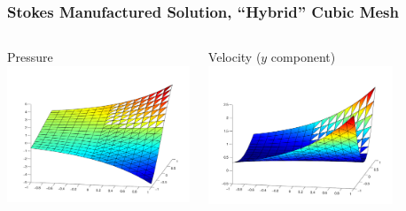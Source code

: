 \documentclass[mathserif]{beamer}
\begin{document}
\begin{frame}
\frametitle{Stokes Manufactured Solution, ``Hybrid'' Cubic Mesh}
\begin{columns}[c]
\begin{column}{5.5cm}
\begin{block}{Pressure}
\includegraphics[width=5.5cm]{pressurecubic16x16}
\end{block}
\end{column}
\begin{column}{5.5cm}
\begin{block}{Velocity ($y$ component)}
\includegraphics[width=5.5cm]{u2cubic16x16}
\end{block}
\end{column}
\end{columns}
\vspace{3 mm}
\end{frame}

\end{document}

